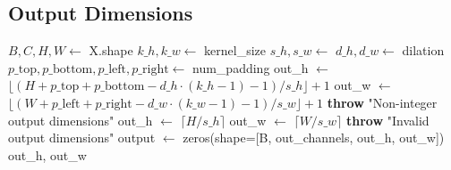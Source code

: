 \documentclass{article}
\begin{document}
\subsection{Output Dimensions}
\begin{algorithm}
\caption{Initialize Output}
\begin{algorithmic}[1]
    \State $B, C, H, W \gets$ X.shape
    \State $k\_h, k\_w \gets$ kernel\_size
    \State $s\_h, s\_w \gets$ 
    \State $d\_h, d\_w \gets$ dilation
    \State $p\_{\text{top}}, p\_{\text{bottom}}, p\_{\text{left}}, p\_{\text{right}} \gets$ num\_padding
        \State out\_h $\gets$ $\lfloor (H + p\_{\text{top}} + p\_{\text{bottom}} - d\_h \cdot (k\_h - 1) - 1) / s\_h \rfloor + 1$
        \State out\_w $\gets$ $\lfloor (W + p\_{\text{left}} + p\_{\text{right}} - d\_w \cdot (k\_w - 1) - 1) / s\_w \rfloor + 1$
            \State \textbf{throw} "Non-integer output dimensions"
        \EndIf
        \State out\_h $\gets$ $\lceil H / s\_h \rceil$
        \State out\_w $\gets$ $\lceil W / s\_w \rceil$
    \EndIf
        \State \textbf{throw} "Invalid output dimensions"
    \EndIf
    \State output $\gets$ zeros(shape=[B, out\_channels, out\_h, out\_w])
    \State \Return out\_h, out\_w
\EndFunction
\end{algorithmic}
\end{algorithm}
\end{document}
